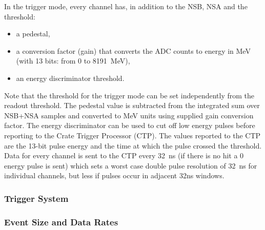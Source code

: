 In the trigger mode, every channel has, in addition to the NSB, NSA and the threshold: 
\begin{itemize}
 \item a pedestal, 
 \item a conversion factor (gain) that converts the ADC counts to energy in MeV (with 13 bits:  from 0 to 8191~MeV), 
 \item an energy discriminator threshold.
 \end{itemize}
Note that the threshold for the trigger mode can be set independently from the readout threshold.
The pedestal value is subtracted from the integrated sum over NSB+NSA samples and 
converted to MeV units using supplied gain conversion factor. The energy discriminator can be used to cut off low energy pulses before reporting to the Crate Trigger Processor (CTP). 
The values reported to the CTP are the 13-bit pulse energy and the time at which the pulse crossed the threshold. 
Data for every channel is sent to the CTP every 32~ns (if there is no hit a 0 energy pulse is sent) which sets a worst case double pulse resolution of 32~ns for individual channels, but less if pulses occur in adjacent 32ns windows.







\subsubsection{Trigger System}
\label{sec:triggerdaq}


\subsubsection{Event Size and Data Rates}

